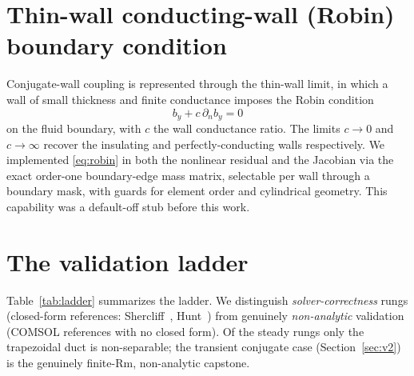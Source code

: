 \documentclass[11pt,letterpaper]{article}
\newcommand{\Rm}{\mathrm{Rm}}
\newcommand{\by}{b_y}
\begin{document}
\section{Thin-wall conducting-wall (Robin) boundary condition}
\label{sec:phase4}
Conjugate-wall coupling is represented through the thin-wall limit, in which a wall
of small thickness and finite conductance imposes the Robin condition
\begin{equation}
  \by + c\,\partial_n \by = 0
  \label{eq:robin}
\end{equation}
on the fluid boundary, with $c$ the wall conductance ratio. The limits $c\!\to\!0$
and $c\!\to\!\infty$ recover the insulating and perfectly-conducting walls
respectively. We implemented \eqref{eq:robin} in both the nonlinear residual and
the Jacobian via the exact order-one boundary-edge mass matrix, selectable per wall
through a boundary mask, with guards for element order and cylindrical geometry.
This capability was a default-off stub before this work.

\section{The validation ladder}
\label{sec:ladder}
Table~\ref{tab:ladder} summarizes the ladder. We distinguish \emph{solver-correctness}
rungs (closed-form references: Shercliff~\cite{shercliff1953}, Hunt~\cite{hunt1965})
from genuinely \emph{non-analytic} validation (COMSOL references with no closed
form). Of the steady rungs only the trapezoidal duct is non-separable; the
transient conjugate case (Section~\ref{sec:v2}) is the genuinely finite-$\Rm$,
non-analytic capstone.
\end{document}

